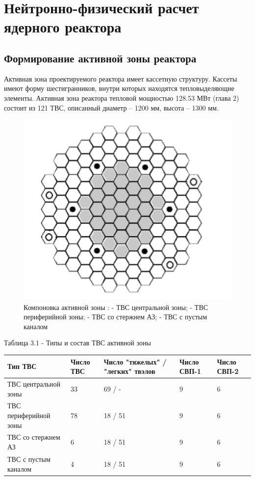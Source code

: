 \chapter{Нейтронно-физический расчет ядерного реактора}

\section{Формирование активной зоны реактора}

Активная зона проектируемого реактора имеет кассетную структуру. Кассеты
имеют форму шестигранников, внутри которых находятся тепловыделяющие
элементы. Активная зона реактора тепловой мощностью 128.53 МВт (глава 2)
состоит из 121 ТВС, описанный диаметр -- 1200 мм, высота -- 1300 мм.

\begin{figure}[!h]
\center
\includegraphics[width=4.43750in,height=3.83293in]{media/image12.png}
\caption{Компоновка активной зоны : - ТВС центральной зоны; - ТВС
периферийной зоны; - ТВС со стержнем АЗ; - ТВС с пустым каналом}
\end{figure}

Таблица 3.1 - Типы и состав ТВС активной зоны


\begin{longtable}[]{@{}lllll@{}}
\toprule
Тип ТВС & Число ТВС & Число "тяжелых" / "легких" твэлов & Число СВП-1 &
Число СВП-2\tabularnewline
\midrule
\endhead
ТВС центральной зоны & 33 & 69 / - & 9 & 6\tabularnewline
ТВС периферийной зоны & 78 & 18 / 51 & 9 & 6\tabularnewline
ТВС со стержнем АЗ & 6 & 18 / 51 & 9 & 6\tabularnewline
ТВС с пустым каналом & 4 & 18 / 51 & 9 & 6\tabularnewline
\bottomrule
\end{longtable}

